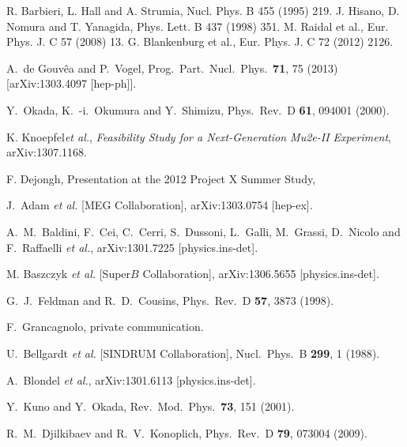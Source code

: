 \begin{thebibliography}{9}

  R. Barbieri, L. Hall and A. Strumia, Nucl. Phys. B 455
(1995) 219.
J. Hisano, D. Nomura and T. Yanagida, Phys. Lett.
B 437 (1998) 351.
M. Raidal et al., Eur. Phys. J. C 57 (2008) 13.
G. Blankenburg et al., Eur. Phys. J. C 72 (2012) 2126.

  A.~de Gouv{\^e}a and P.~Vogel,
  Prog.\ Part.\ Nucl.\ Phys.\  {\bf 71}, 75 (2013)
  [arXiv:1303.4097 [hep-ph]].
  
    Y.~Okada, K.~-i.~Okumura and Y.~Shimizu, Phys.\ Rev.\ D {\bf 61}, 094001 (2000).
  
K. Knoepfel{\it  et al.},  {\it{Feasibility Study for a Next-Generation Mu2e-II Experiment}}, arXiv:1307.1168.

F. Dejongh, Presentation at the 2012 Project X Summer Study,
\hfill{}

 J.~Adam {\it et al.}  [MEG Collaboration],
  arXiv:1303.0754 [hep-ex].

 A.~M.~Baldini, F.~Cei, C.~Cerri, S.~Dussoni, L.~Galli, M.~Grassi, D.~Nicolo and F.~Raffaelli {\it et al.},
  arXiv:1301.7225 [physics.ins-det].

M. Baszczyk {\it et al.} [Super$B$ Collaboration],
arXiv:1306.5655 [physics.ins-det].

  G.~J.~Feldman and R.~D.~Cousins,
  Phys.\ Rev.\ D {\bf 57}, 3873 (1998).
  
 F.~Grancagnolo, private communication.

  U.~Bellgardt {\it et al.}  [SINDRUM Collaboration], Nucl.\ Phys.\ B {\bf 299}, 1 (1988).

 A.~Blondel {\it et al.}, arXiv:1301.6113 [physics.ins-det].

 Y.~Kuno and Y.~Okada, Rev.\ Mod.\ Phys.\  {\bf 73}, 151 (2001).

 R.~M.~Djilkibaev and R.~V.~Konoplich, Phys.\ Rev.\ D {\bf 79}, 073004 (2009).

\end{thebibliography}
